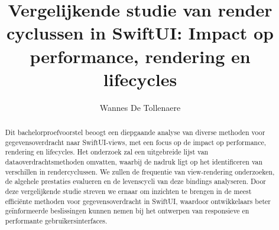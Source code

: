 \documentclass{hogent-article}
\title{Vergelijkende studie van render cyclussen in SwiftUI: Impact op performance, rendering en lifecycles}
\author{Wannes De Tollenaere}
\begin{document}
\begin{abstract}
  Dit bachelorproefvoorstel beoogt een diepgaande analyse van diverse methoden voor gegevensoverdracht naar SwiftUI-views, met een focus op de impact op performance, rendering en lifecycles. Het onderzoek zal een uitgebreide lijst van dataoverdrachtsmethoden omvatten, waarbij de nadruk ligt op het identificeren van verschillen in rendercyclussen. We zullen de frequentie van view-rendering onderzoeken, de algehele prestaties evalueren en de levenscycli van deze bindings analyseren. Door deze vergelijkende studie streven we ernaar om inzichten te brengen in de meest efficiënte methoden voor gegevensoverdracht in SwiftUI, waardoor ontwikkelaars beter geïnformeerde beslissingen kunnen nemen bij het ontwerpen van responsieve en performante gebruikersinterfaces.
\end{abstract}

\tableofcontents



\printbibliography[heading=bibintoc]
\end{document}
